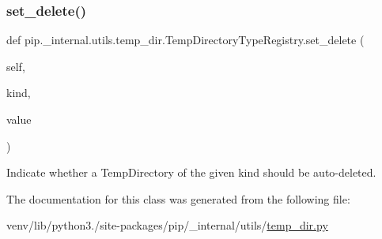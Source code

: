 \subsubsection{\texorpdfstring{set\+\_\+delete()}{set\_delete()}}
{\footnotesize\ttfamily def pip.\+\_\+internal.\+utils.\+temp\+\_\+dir.\+Temp\+Directory\+Type\+Registry.\+set\+\_\+delete (\begin{DoxyParamCaption}\item[{}]{self,  }\item[{}]{kind,  }\item[{}]{value }\end{DoxyParamCaption})}

\begin{DoxyVerb}Indicate whether a TempDirectory of the given kind should be
auto-deleted.
\end{DoxyVerb}
 

The documentation for this class was generated from the following file\+:\begin{DoxyCompactItemize}
\item 
venv/lib/python3./site-\/packages/pip/\+\_\+internal/utils/\hyperlink{temp__dir_8py}{temp\+\_\+dir.\+py}\end{DoxyCompactItemize}
